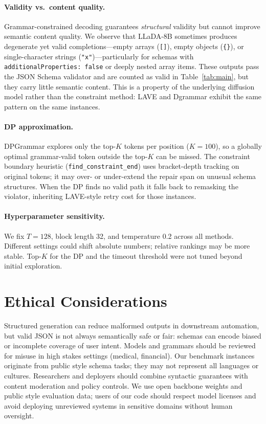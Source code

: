 \paragraph{Validity vs.\ content quality.}
Grammar-constrained decoding guarantees \emph{structural} validity but cannot improve semantic content quality.
We observe that LLaDA-8B sometimes produces degenerate yet valid completions---empty arrays (\texttt{[]}), empty objects (\texttt{\{\}}), or single-character strings (\texttt{"x"})---particularly for schemas with \texttt{additionalProperties:~false} or deeply nested array items.
These outputs pass the JSON Schema validator and are counted as valid in Table~\ref{tab:main}, but they carry little semantic content.
This is a property of the underlying diffusion model rather than the constraint method: LAVE and Dgrammar exhibit the same pattern on the same instances.

\paragraph{DP approximation.}
DPGrammar explores only the top-$K$ tokens per position ($K{=}100$), so a globally optimal grammar-valid token outside the top-$K$ can be missed.
The constraint boundary heuristic (\texttt{find\_constraint\_end}) uses bracket-depth tracking on original tokens; it may over- or under-extend the repair span on unusual schema structures.
When the DP finds no valid path it falls back to remasking the violator, inheriting LAVE-style retry cost for those instances.

\paragraph{Hyperparameter sensitivity.}
We fix $T{=}128$, block length 32, and temperature 0.2 across all methods.
Different settings could shift absolute numbers; relative rankings may be more stable.
Top-$K$ for the DP and the timeout threshold were not tuned beyond initial exploration.

\section{Ethical Considerations}

Structured generation can reduce malformed outputs in downstream automation, but valid JSON is not always semantically safe or fair: schemas can encode biased or incomplete coverage of user intent. Models and grammars should be reviewed for misuse in high stakes settings (medical, financial). Our benchmark instances originate from public style schema tasks; they may not represent all languages or cultures. Researchers and deployers should combine syntactic guarantees with content moderation and policy controls. We use open backbone weights and public style evaluation data; users of our code should respect model licenses and avoid deploying unreviewed systems in sensitive domains without human oversight.
